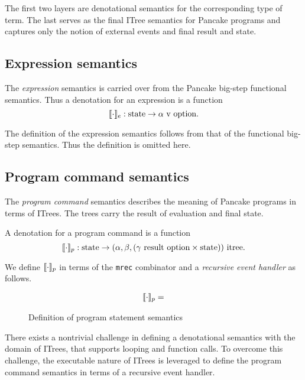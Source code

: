 \documentclass[graybox,envcountsect]{SVMonoEnhanced}
\begin{document}
The first two layers are denotational semantics for the corresponding type of term. The last serves as the final ITree semantics for Pancake programs and captures only the notion of external events and final result and state.

\subsection{Expression semantics}
\label{sec:expression-semantics}

The \emph{expression} semantics is carried over from the Pancake big-step functional semantics. Thus a denotation for an expression is a function
\begin{equation*}
  \llbracket \cdot \rrbracket_{e} : \text{state} \to \alpha\ \text{v}\ \text{option}.
\end{equation*}

The definition of the expression semantics follows from that of the functional big-step semantics. Thus the definition is omitted here.

\subsection{Program command semantics}
\label{sec:progr-comm-semant-1}

The \emph{program command} semantics describes the meaning of Pancake programs in terms of ITrees. The trees carry the result of evaluation and final state.

A denotation for a program command is a function
\begin{equation*}
  \sem{\cdot}_{p} : \text{state} \to (\alpha, \beta, (\gamma\ \text{result}\ \text{option} \times \text{state}))\ \text{itree}.
\end{equation*}

We define $\llbracket \cdot \rrbracket_{p}$ in terms of the \verb|mrec| combinator and a \emph{recursive event handler} as follows.
\begin{figure}[H]
  \centering
  \begin{align*}
    \llbracket \cdot \rrbracket_{p} =
  \end{align*}
  \caption{Definition of program statement semantics}
  \label{fig:sem_itree_prog}
\end{figure}

There exists a nontrivial challenge in defining a denotational semantics with the domain of ITrees, that supports looping and function calls. To overcome this challenge, the executable nature of ITrees is leveraged to define the program command semantics in terms of a recursive event handler.
\end{document}
